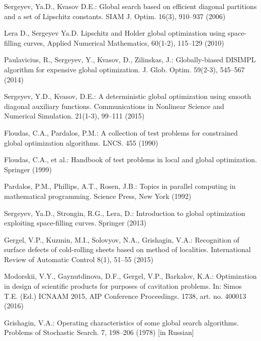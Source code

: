 \documentclass{llncs}
\begin{document}
\begin{thebibliography}{99}
Sergeyev, Ya.D., Kvasov D.E.: Global search based on efficient diagonal partitions and a set of Lipschitz constants. SIAM J. Optim. 16(3), 910--937 (2006)

 Lera D., Sergeyev Ya.D. Lipschitz and Holder global optimization using space-filling curves, Applied Numerical Mathematics, 60(1-2), 115--129 (2010)

Paulavicius, R., Sergeyev, Y., Kvasov, D., Zilinskas, J.: Globally-biased DISIMPL algorithm for expensive global optimization. J. Glob. Optim. 59(2-3), 545--567 (2014)

Sergeyev, Y.D., Kvasov, D.E.: A deterministic global optimization using smooth diagonal auxiliary functions. Communications in Nonlinear Science and Numerical Simulation. 21(1-3), 99--111 (2015)

Floudas, C.A., Pardalos, P.M.: A collection of test problems for constrained global optimization algorithms. LNCS. 455 (1990)

Floudas, C.A., et al.: Handbook of test problems in local and global optimization.  Springer (1999)

Pardalos, P.M., Phillips, A.T., Rosen, J.B.: Topics in parallel computing in mathematical programming. Science Press, New York (1992)

Sergeyev, Ya.D., Strongin, R.G., Lera, D.: Introduction to global optimization exploiting space-filling curves. Springer (2013)

Gergel, V.P., Kuzmin, M.I., Solovyov, N.A., Grishagin, V.A.: Recognition of surface defects of cold-rolling sheets based on method of localities. International Review of Automatic Control 8(1), 51--55 (2015)

Modorskii, V.Y., Gaynutdinova, D.F., Gergel, V.P., Barkalov, K.A.: Optimization in design of scientific products for purposes of cavitation problems. In: Simos T.E. (Ed.) ICNAAM 2015, AIP Conference Proceedings. 1738, art. no. 400013 (2016)

Grishagin, V.A.: Operating characteristics of some global search algorithms. Problems of Stochastic Search. 7, 198--206 (1978) [in Russian]
                                                                           
\end{thebibliography}
\end{document}
